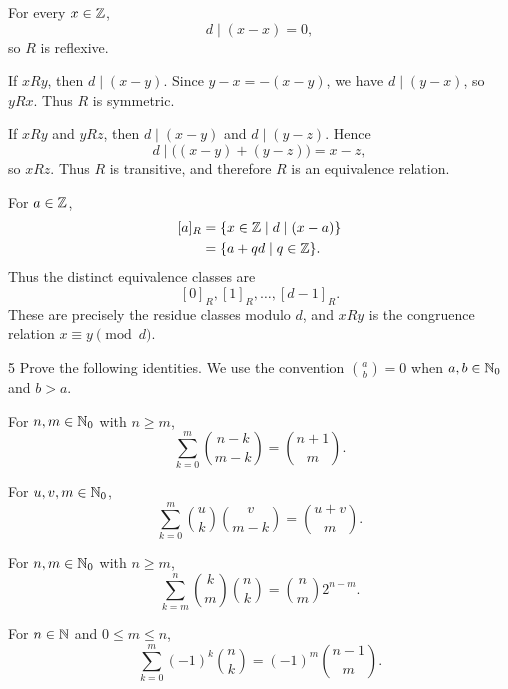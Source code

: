 \documentclass[11pt,oneside]{article}
\begin{document}
\begin{solution}
For every $x\in\mathbb{Z}$,
\[
    d\mid(x-x)=0,
\]
so $R$ is reflexive.

If $xRy$, then $d\mid(x-y)$. Since $y-x=-(x-y)$, we have $d\mid(y-x)$, so $yRx$. Thus $R$ is symmetric.

If $xRy$ and $yRz$, then $d\mid(x-y)$ and $d\mid(y-z)$. Hence
\[
    d\mid\bigl((x-y)+(y-z)\bigr)=x-z,
\]
so $xRz$. Thus $R$ is transitive, and therefore $R$ is an equivalence relation.

For $a\in\mathbb{Z}$,
\[
\begin{aligned}
    [a]_R
    &=\{x\in\Z\mid d\mid(x-a)\}\\
    &=\{a+qd\mid q\in\Z\}.
\end{aligned}
\]
Thus the distinct equivalence classes are
\[
    [0]_R,[1]_R,\ldots,[d-1]_R.
\]
These are precisely the residue classes modulo $d$, and $xRy$ is the congruence relation $x\equiv y\pmod d$.
\end{solution}

\begin{problem}{5}
Prove the following identities. We use the convention $\binom{a}{b}=0$ when $a,b\in\mathbb{N}_0$ and $b>a$.
\begin{problemsubparts}
    \item For $n,m\in\mathbb{N}_0$ with $n\geq m$,
    \[
        \sum_{k=0}^{m}\binom{n-k}{m-k}
        =\binom{n+1}{m}.
    \]

    \item For $u,v,m\in\mathbb{N}_0$,
    \[
        \sum_{k=0}^{m}\binom{u}{k}\binom{v}{m-k}
        =\binom{u+v}{m}.
    \]

    \item For $n,m\in\mathbb{N}_0$ with $n\geq m$,
    \[
        \sum_{k=m}^{n}\binom{k}{m}\binom{n}{k}
        =\binom{n}{m}2^{n-m}.
    \]

    \item For $n\in\mathbb{N}$ and $0\leq m\leq n$,
    \[
        \sum_{k=0}^{m}(-1)^k\binom{n}{k}
        =(-1)^m\binom{n-1}{m}.
    \]
\end{problemsubparts}
\end{problem}
\end{document}
